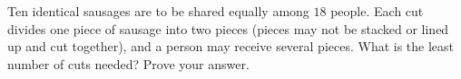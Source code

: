 Ten identical sausages are to be shared equally among $18$ people. Each cut divides one piece of sausage into two pieces (pieces may not be stacked or lined up and cut together), and a person may receive several pieces. What is the least number of cuts needed? Prove your answer.
